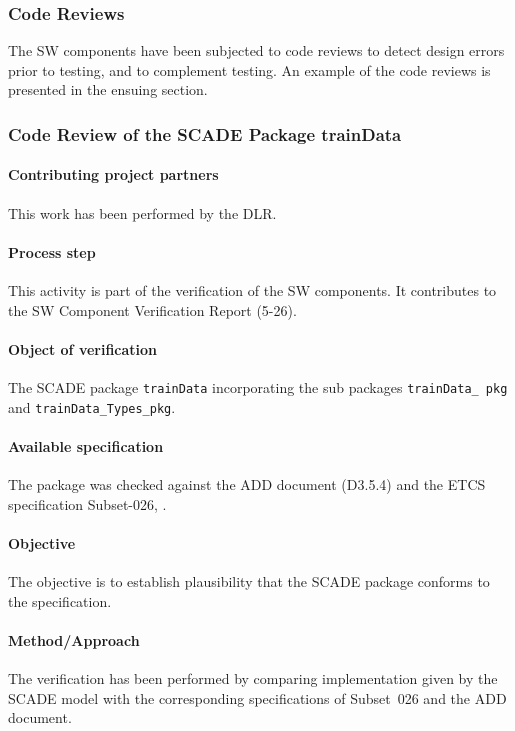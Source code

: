 
\subsubsection{Code Reviews}
\label{sec:code-reviews}

The SW components have been subjected to code reviews to detect design
errors prior to testing, and to complement testing. An example of the
code reviews is presented in the ensuing section. 


\subsubsection{Code Review of the SCADE Package trainData}
\label{sec:VnV-SCADETrainData-DLR}

\paragraph{Contributing project partners}
This work has been performed by the DLR.

\paragraph{Process step}
This activity is part of the verification of the SW components. It
contributes to the SW Component Verification Report (5-26). 

\paragraph{Object of verification}
The SCADE package \texttt{trainData} incorporating the sub packages \texttt{trainData\_
pkg} and \texttt{trainData\_Types\_pkg}.

\paragraph{Available specification}
The package was checked against the ADD document (D3.5.4) and the ETCS
specification Subset-026, \cite[Sec.~3.18.3]{subset-026:3.3.0}.

\paragraph{Objective}
The objective is to establish plausibility that the SCADE package
conforms to the specification.

\paragraph{Method/Approach}
The verification has been performed by comparing implementation given
by the SCADE model with the corresponding specifications of Subset~026
and the ADD document.

